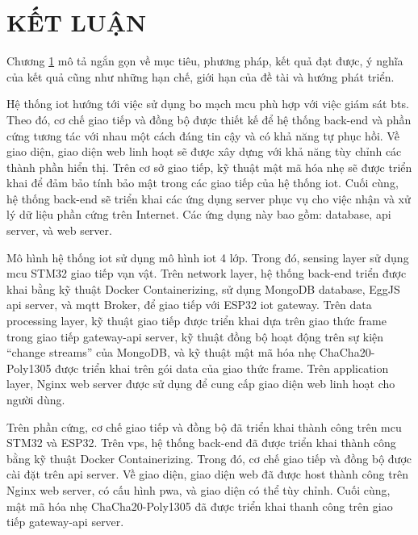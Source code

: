 \chapter{KẾT LUẬN}
\label{Chapter5}

Chương \ref{Chapter5} mô tả ngắn gọn về mục tiêu, phương pháp, kết quả đạt được, ý nghĩa của kết quả cũng như những hạn chế, giới hạn của đề tài và hướng phát triển.

Hệ thống \acrshort{iot} hướng tới việc sử dụng bo mạch \acrshort{mcu} phù hợp với việc giám sát \acrshort{bts}. Theo đó, cơ chế giao tiếp và đồng bộ được thiết kế để hệ thống back-end và phần cứng tương tác với nhau một cách đáng tin cậy và có khả năng tự phục hồi. Về giao diện, giao diện web linh hoạt sẽ được xây dựng với khả năng tùy chỉnh các thành phần hiển thị. Trên cơ sở giao tiếp, kỹ thuật mật mã hóa nhẹ sẽ được triển khai để đảm bảo tính bảo mật trong các giao tiếp của hệ thống \acrshort{iot}. Cuối cùng, hệ thống back-end sẽ triển khai các ứng dụng server phục vụ cho việc nhận và xử lý dữ liệu phần cứng trên Internet. Các ứng dụng này bao gồm: database, \acrshort{api} server, và web server.

Mô hình hệ thống \acrshort{iot} sử dụng mô hình \acrshort{iot} 4 lớp. Trong đó, sensing layer sử dụng \acrshort{mcu} STM32 giao tiếp vạn vật. Trên network layer, hệ thống back-end triển được khai bằng kỹ thuật Docker Containerizing, sử dụng MongoDB database, EggJS \acrshort{api} server, và \acrshort{mqtt} Broker, để giao tiếp với ESP32 \acrshort{iot} gateway. Trên data processing layer, kỹ thuật giao tiếp được triển khai dựa trên giao thức frame trong giao tiếp gateway-\acrshort{api} server, kỹ thuật đồng bộ hoạt động trên sự kiện ``change streams'' của MongoDB, và kỹ thuật mật mã hóa nhẹ ChaCha20-Poly1305 được triển khai trên gói data của giao thức frame. Trên application layer, Nginx web server được sử dụng để cung cấp giao diện web linh hoạt cho người dùng.

Trên phần cứng, cơ chế giao tiếp và đồng bộ đã triển khai thành công trên \acrshort{mcu} STM32 và ESP32. Trên \acrshort{vps}, hệ thống back-end đã được triển khai thành công bằng kỹ thuật Docker Containerizing. Trong đó, cơ chế giao tiếp và đồng bộ được cài đặt trên \acrshort{api} server. Về giao diện, giao diện web đã được host thành công trên Nginx web server, có cấu hình \acrshort{pwa}, và giao diện có thể tùy chỉnh. Cuối cùng, mật mã hóa nhẹ ChaCha20-Poly1305 đã được triển khai thanh công trên giao tiếp gateway-\acrshort{api} server.

